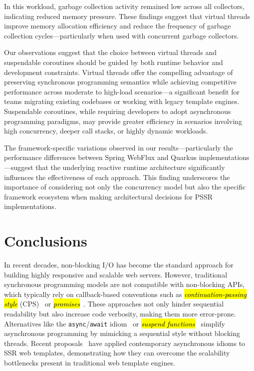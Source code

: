 \documentclass[software,article,accept,pdftex,moreauthors]{Definitions/mdpi}
\begin{document}
In this workload, garbage collection activity remained low across all
collectors, indicating reduced memory pressure. These findings suggest that
virtual threads improve memory allocation efficiency and reduce the frequency
of garbage collection cycles---particularly when used with concurrent garbage
collectors.

Our observations suggest that the choice between virtual threads and
suspendable coroutines should be guided by both runtime behavior and
development constraints. Virtual threads offer the compelling advantage of
preserving synchronous programming semantics while achieving competitive
performance across moderate to high-load scenarios---a significant benefit for
teams migrating existing codebases or working with legacy template engines.
Suspendable coroutines, while requiring developers to adopt asynchronous
programming paradigms, may provide greater efficiency in scenarios involving
high concurrency, deeper call stacks, or highly dynamic workloads.

The framework-specific variations observed in our results---particularly the
performance differences between Spring WebFlux and Quarkus
implementations---suggest that the underlying reactive runtime architecture
significantly influences the effectiveness of each approach. This finding
underscores the importance of considering not only the concurrency model but
also the specific framework ecosystem when making architectural decisions for
PSSR implementations.

\section{Conclusions}\label{s7}

In recent decades, non-blocking I/O has become the standard approach for building
highly responsive and scalable web servers. However, traditional synchronous
programming models are not compatible with non-blocking APIs, which typically
rely on callback-based conventions such as
\textit{\hl{continuation-passing style}} (CPS)~\cite{scheme} or
\textit{\hl{promises}}~\cite{promise}. These approaches not only hinder
sequential readability but also increase code verbosity, making them more
error-prone.
Alternatives like the \texttt{async}/\texttt{await} idiom~\cite{async_await}
or \textit{\hl{suspend functions}}~\cite{elizarov2021coroutines} simplify
asynchronous programming by mimicking a sequential style without blocking
threads.
Recent proposals~\cite{carvalho2023async,wise2024pssr} have applied contemporary
asynchronous idioms to SSR web templates, demonstrating how they can overcome
the scalability bottlenecks present in traditional web template engines.
\end{document}
